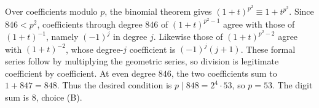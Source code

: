 Over coefficients modulo $p$, the binomial theorem gives $(1+t)^{p^2}\equiv1+t^{p^2}$. Since $846<p^2$, coefficients through degree $846$ of $(1+t)^{p^2-1}$ agree with those of $(1+t)^{-1}$, namely $(-1)^j$ in degree $j$. Likewise those of $(1+t)^{p^2-2}$ agree with $(1+t)^{-2}$, whose degree-$j$ coefficient is $(-1)^j(j+1)$. These formal series follow by multiplying the geometric series, so division is legitimate coefficient by coefficient. At even degree $846$, the two coefficients sum to $1+847=848$. Thus the desired condition is $p\mid848=2^4\cdot53$, so $p=53$. The digit sum is $\boxed8$, choice (B).
